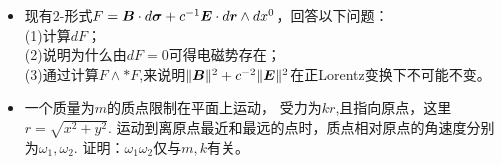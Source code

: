 \begin{itemize}
    \item[6.]现有$2$-形式$F=\boldsymbol{B}\cdot d\boldsymbol{\sigma}+c^{-1}\boldsymbol{E}\cdot d\boldsymbol{r}\wedge dx^0$，回答以下问题：\\
    (1)计算$dF$；\\
    (2)说明为什么由$dF=0$可得电磁势存在；\\
    (3)通过计算$F\wedge *F$,来说明$\|\boldsymbol{B}\|^2+c^{-2}\|\boldsymbol{E}\|^2$在正Lorentz变换下不可能不变。
    \item[7.]一个质量为$m$的质点限制在平面上运动，
    受力为$kr$,且指向原点，这里$r=\sqrt{x^2+y^2}$.
    运动到离原点最近和最远的点时，质点相对原点的角速度分别为$\omega_1,\omega_2$.
    证明：$\omega_1\omega_2$仅与$m,k$有关。
\end{itemize}